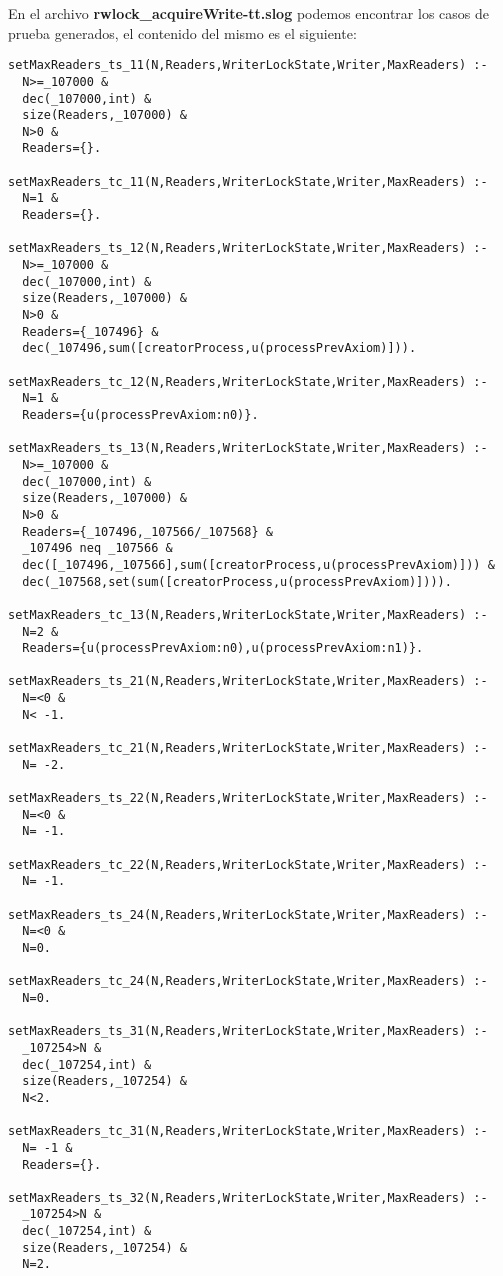 \documentclass[a4paper, 12pt]{article}
\begin{document}
En el archivo \textbf{rwlock\_acquireWrite-tt.slog} podemos encontrar los casos de prueba generados, el contenido del mismo es el siguiente:
\begin{verbatim}
setMaxReaders_ts_11(N,Readers,WriterLockState,Writer,MaxReaders) :-
  N>=_107000 &
  dec(_107000,int) &
  size(Readers,_107000) &
  N>0 &
  Readers={}.

setMaxReaders_tc_11(N,Readers,WriterLockState,Writer,MaxReaders) :-
  N=1 &
  Readers={}.

setMaxReaders_ts_12(N,Readers,WriterLockState,Writer,MaxReaders) :-
  N>=_107000 &
  dec(_107000,int) &
  size(Readers,_107000) &
  N>0 &
  Readers={_107496} &
  dec(_107496,sum([creatorProcess,u(processPrevAxiom)])).

setMaxReaders_tc_12(N,Readers,WriterLockState,Writer,MaxReaders) :-
  N=1 &
  Readers={u(processPrevAxiom:n0)}.

setMaxReaders_ts_13(N,Readers,WriterLockState,Writer,MaxReaders) :-
  N>=_107000 &
  dec(_107000,int) &
  size(Readers,_107000) &
  N>0 &
  Readers={_107496,_107566/_107568} &
  _107496 neq _107566 &
  dec([_107496,_107566],sum([creatorProcess,u(processPrevAxiom)])) &
  dec(_107568,set(sum([creatorProcess,u(processPrevAxiom)]))).

setMaxReaders_tc_13(N,Readers,WriterLockState,Writer,MaxReaders) :-
  N=2 &
  Readers={u(processPrevAxiom:n0),u(processPrevAxiom:n1)}.

setMaxReaders_ts_21(N,Readers,WriterLockState,Writer,MaxReaders) :-
  N=<0 &
  N< -1.

setMaxReaders_tc_21(N,Readers,WriterLockState,Writer,MaxReaders) :-
  N= -2.

setMaxReaders_ts_22(N,Readers,WriterLockState,Writer,MaxReaders) :-
  N=<0 &
  N= -1.

setMaxReaders_tc_22(N,Readers,WriterLockState,Writer,MaxReaders) :-
  N= -1.

setMaxReaders_ts_24(N,Readers,WriterLockState,Writer,MaxReaders) :-
  N=<0 &
  N=0.

setMaxReaders_tc_24(N,Readers,WriterLockState,Writer,MaxReaders) :-
  N=0.

setMaxReaders_ts_31(N,Readers,WriterLockState,Writer,MaxReaders) :-
  _107254>N &
  dec(_107254,int) &
  size(Readers,_107254) &
  N<2.

setMaxReaders_tc_31(N,Readers,WriterLockState,Writer,MaxReaders) :-
  N= -1 &
  Readers={}.

setMaxReaders_ts_32(N,Readers,WriterLockState,Writer,MaxReaders) :-
  _107254>N &
  dec(_107254,int) &
  size(Readers,_107254) &
  N=2.


\end{verbatim}
\end{document}
